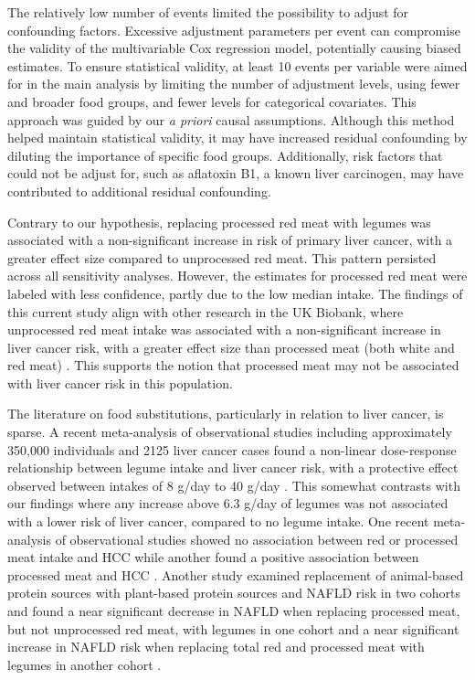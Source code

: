 \documentclass[nutrients,article,submit,moreauthors,pdftex]{Definitions/mdpi}
\begin{document}
The relatively low number of events limited the possibility to adjust
for confounding factors. Excessive adjustment parameters per event can
compromise the validity of the multivariable Cox regression model,
potentially causing biased estimates. To ensure statistical validity, at
least 10 events per variable were aimed for in the main analysis by
limiting the number of adjustment levels, using fewer and broader food
groups, and fewer levels for categorical covariates. This approach was
guided by our \emph{a priori} causal assumptions. Although this method helped
maintain statistical validity, it may have increased residual
confounding by diluting the importance of specific food groups.
Additionally, risk factors that could not be adjust for, such as
aflatoxin B1, a known liver carcinogen, may have contributed to
additional residual confounding.

Contrary to our hypothesis, replacing processed red meat with legumes
was associated with a non-significant increase in risk of primary liver
cancer, with a greater effect size compared to unprocessed red meat.
This pattern persisted across all sensitivity analyses. However, the
estimates for processed red meat were labeled with less confidence,
partly due to the low median intake. The findings of this current study
align with other research in the UK Biobank, where unprocessed red meat
intake was associated with a non-significant increase in liver cancer
risk, with a greater effect size than processed meat (both white and red
meat) \citep{Knuppel2020}. This supports the notion that processed meat may
not be associated with liver cancer risk in this population.

The literature on food substitutions, particularly in relation to liver
cancer, is sparse. A recent meta-analysis of observational studies
including approximately 350,000 individuals and 2125 liver cancer cases
found a non-linear dose-response relationship between legume intake and
liver cancer risk, with a protective effect observed between intakes of
8 g/day to 40 g/day \citep{liu2023a}. This somewhat contrasts with our
findings where any increase above 6.3 g/day of legumes was not
associated with a lower risk of liver cancer, compared to no legume
intake. One recent meta-analysis of observational studies showed no
association between red or processed meat intake and HCC \citep{Di2023} while
another found a positive association between processed meat and HCC
\citep{Yu2022}. Another study examined replacement of animal-based protein
sources with plant-based protein sources and NAFLD risk in two cohorts
and found a near significant decrease in NAFLD when replacing processed
meat, but not unprocessed red meat, with legumes in one cohort and a
near significant increase in NAFLD risk when replacing total red and
processed meat with legumes in another cohort \citep{Zhang2023}.
\end{document}
